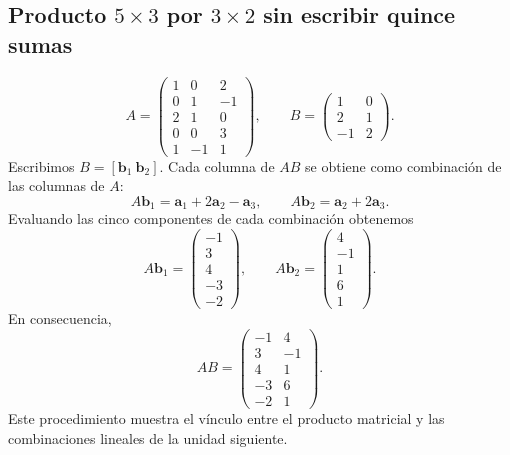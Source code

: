 \documentclass[12pt]{article}
\theoremstyle{remark}
\newcommand{\vect}[1]{\boldsymbol{#1}}
\begin{document}
\subsection{Producto $5\times3$ por $3\times2$ sin escribir quince sumas}
\[
A=\begin{pmatrix}1&0&2\\0&1&-1\\2&1&0\\0&0&3\\1&-1&1\end{pmatrix},\qquad
B=\begin{pmatrix}1&0\\2&1\\-1&2\end{pmatrix}.
\]
Escribimos $B=[\vect b_1\ \vect b_2]$. Cada columna de $AB$ se obtiene como combinación de las columnas de $A$:
\[
A\vect b_1=\vect a_1+2\vect a_2-\vect a_3,
\qquad A\vect b_2=\vect a_2+2\vect a_3.
\]
Evaluando las cinco componentes de cada combinación obtenemos
\[
A\vect b_1=\begin{pmatrix}-1\\3\\4\\-3\\-2\end{pmatrix},\qquad
A\vect b_2=\begin{pmatrix}4\\-1\\1\\6\\1\end{pmatrix}.
\]
En consecuencia,
\[\boxed{AB=\begin{pmatrix}-1&4\\3&-1\\4&1\\-3&6\\-2&1\end{pmatrix}.}\]
Este procedimiento muestra el vínculo entre el producto matricial y las combinaciones lineales de la unidad siguiente.
\end{document}
